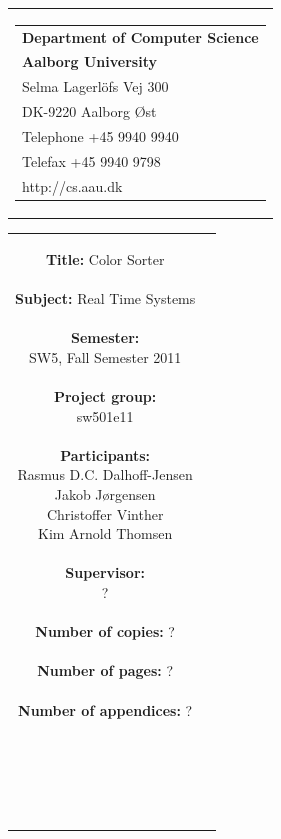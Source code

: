 \begin{nopagebreak}
\samepage 
\begin{tabular}{r}
\parbox{\textwidth}{
\hfill \parbox{6.2cm}{\begin{tabular}{l}
{\textsf\small \textbf{Department of Computer Science }}\\
{\textsf\small  \textbf{Aalborg University}}\\
{\textsf\small Selma Lagerlöfs Vej 300}\\
{\textsf\small DK-9220 Aalborg Øst}\\
{\textsf\small Telephone +45 9940 9940}\\
{\textsf\small Telefax +45 9940 9798}\\
{\textsf\small http://cs.aau.dk}
\end{tabular}}}
\end{tabular}

\begin{tabular}{cc}
\parbox{7cm}{
\textbf{Title:} 
Color Sorter\\ \\
\textbf{Subject:} 
Real Time Systems\\ \\
\textbf{Semester:} \\
SW5, Fall Semester 2011\\ \\
\textbf{Project group:} \\
sw501e11\\ \\
\textbf{Participants:} \\
Rasmus D.C. Dalhoff-Jensen \\
Jakob Jørgensen \\
Christoffer Vinther \\
Kim Arnold Thomsen \\ \\
\textbf{Supervisor:} \\
?\\ \\
\textbf{Number of copies:}
? \\ \\
\textbf{Number of pages:}
? \\ \\
\textbf{Number of appendices:}
? \\ \\
\date{} \\ \\ \\
}


\end{tabular}
\end{nopagebreak}
